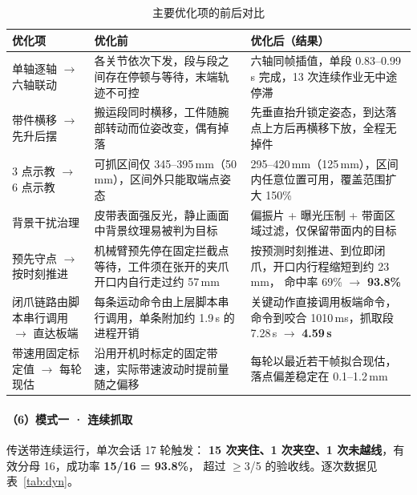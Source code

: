 \documentclass[UTF8,a4paper,zihao=5,fontset=windows]{ctexart}
\begin{document}
\begin{table}[H]\centering\small
\caption{主要优化项的前后对比}
\label{tab:opt}
\begin{tabularx}{\linewidth}{@{}p{2.6cm}p{4.3cm}X@{}}
\toprule
优化项 & 优化前 & 优化后（结果） \\
\midrule
单轴逐轴 $\rightarrow$ 六轴联动 &
各关节依次下发，段与段之间存在停顿与等待，末端轨迹不可控 &
六轴同帧插值，单段 0.83--0.99\,s 完成，13 次连续作业无中途停滞 \\
带件横移 $\rightarrow$ 先升后摆 &
搬运段同时横移，工件随腕部转动而位姿改变，偶有掉落 &
先垂直抬升锁定姿态，到达落点上方后再横移下放，全程无掉件 \\
3 点示教 $\rightarrow$ 6 点示教 &
可抓区间仅 345--395\,mm（50\,mm），区间外只能取端点姿态 &
295--420\,mm（125\,mm），区间内任意位置可用，覆盖范围扩大 150\% \\
背景干扰治理 &
皮带表面强反光，静止画面中背景纹理易被判为目标 &
偏振片 + 曝光压制 + 带面区域过滤，仅保留带面内的目标 \\
预先守点 $\rightarrow$ 按时刻推进 &
机械臂预先停在固定拦截点等待，工件须在张开的夹爪开口内自行走过约 57\,mm &
按预测时刻推进、到位即闭爪，开口内行程缩短到约 23\,mm，
命中率 69\% $\rightarrow$ \textbf{93.8\%} \\
闭爪链路由脚本串行调用 $\rightarrow$ 直达板端 &
每条运动命令由上层脚本串行调用，单条附加约 1.9\,s 的进程开销 &
关键动作直接调用板端命令，命令到咬合 1010\,ms，抓取段 7.28\,s $\rightarrow$ \textbf{4.59\,s} \\
带速用固定标定值 $\rightarrow$ 每轮现估 &
沿用开机时标定的固定带速，实际带速波动时提前量随之偏移 &
每轮以最近若干帧拟合现估，落点偏差稳定在 0.1--1.2\,mm \\
\bottomrule
\end{tabularx}
\end{table}

\paragraph{（6）模式一 · 连续抓取} 传送带连续运行，单次会话 17 轮触发：
\textbf{15 次夹住、1 次夹空、1 次未越线}，有效分母 16，成功率 \textbf{15/16 = 93.8\%}，
超过 $\geq$3/5 的验收线。逐次数据见表~\ref{tab:dyn}。
\end{document}

